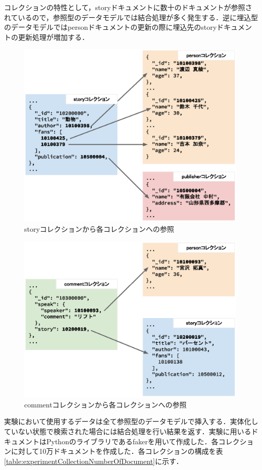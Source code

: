 \documentclass[a4paper,11pt]{ujreport}
\begin{document}
コレクションの特性として，storyドキュメントに数十のドキュメントが参照されているので，参照型のデータモデルでは結合処理が多く発生する．逆に埋込型のデータモデルではpersonドキュメントの更新の際に埋込先のstoryドキュメントの更新処理が増加する．

\begin{figure}[htbp]
	\begin{center}
		\includegraphics[width=30em, trim=10em 2em 10em 0]{src/ExperimentCollection.eps} %
	\end{center}
	\caption{storyコレクションから各コレクションへの参照}
	\label{figure:ExperimentCollection}
\end{figure}
\begin{figure}[htbp]
	\begin{center}
		\includegraphics[width=30em, trim=10em 2em 10em 2em]{src/ExperimentCollection2.eps} %
	\end{center}
	\caption{commentコレクションから各コレクションへの参照}
	\label{figure:ExperimentCollection2}
\end{figure}
実験において使用するデータは全て参照型のデータモデルで挿入する．実体化していない状態で検索された場合には結合処理を行い結果を返す．実験に用いるドキュメントはPythonのライブラリであるfaker\cite{faker}を用いて作成した．各コレクションに対して10万ドキュメントを作成した．各コレクションの構成を表\ref{table:experimentCollectionNumberOfDocument}に示す．
\end{document}
